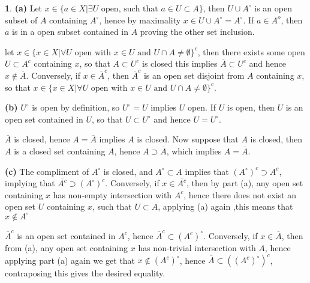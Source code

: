 \documentclass[10.5pt]{article}
\theoremstyle{definition}
\newtheorem{pb}{}
\newcommand{\set}[1]{\{#1\}}
\newcommand{\tand}[1]{\text{ and }}
\begin{document}
    \begin{pb}
        \textbf{(a)} Let \(x \in \set{a\in X \vert \exists U \text{ open, such that } a \in U \subset A}\), then \(U \cup A^\circ\) is an open subset of \(A\) containing \(A^\circ\),
        hence by maximality \(x \in U \cup A^\circ = A^\circ\). If \(a \in A^o\), then \(a\) is in a open subset contained in \(A\) proving the other set inclusion.

        let \(x \in \set{x \in X \vert \forall U \text{ open with } x \in U \tand UU \cap A \neq \emptyset}^c\), then there exists some open \(U \subset A^c\) containing \(x\),
        so that \(A \subset U^c\) is closed this implies \(\overline{A} \subset U^c\) and hence \(x \not \in \overline{A}\). Conversely, if \(x \in \overline{A}^c\), then
        \(\overline{A}^c\) is an open set disjoint from \(A\) containing \(x\), so that \(x \in \set{x \in X \vert \forall U \text{ open with } x \in U \tand UU \cap A \neq \emptyset}^c\).

        \textbf{(b)} \(U^\circ\) is open by definition, so \(U^\circ = U\) implies \(U\) open. If \(U\) is open, then \(U\) is an open set contained in \(U\), so that \(U \subset U^\circ\) 
        and hence \(U = U^\circ\).

        \(\overline{A}\) is closed, hence \(A = \overline{A}\) implies \(A\) is closed. Now suppose that \(A\) is closed, then \(A\) is a closed set containing \(A\), hence
        \(A \supset \overline{A}\), which implies \(A = \overline{A}\).

        \textbf{(c)} The compliment of \(A^\circ\) is closed, and \(A^\circ \subset A\) implies that \(\left(A^\circ\right)^c \supset A^c\), implying that
        \(\overline{A^c} \supset \left(A^\circ\right)^c\). Conversely, if \(x \in \overline{A^c}\), then by part (a), any open set containing \(x\) has non-empty
        intersection with \(A^c\), hence there does not exist an open set \(U\) containing \(x\), such that \(U \subset A\), applying (a) again ,this means that
        \(x \not \in A^\circ\)

        \(\overline{A}^c\) is an open set contained in \(A^c\), hence \(\overline{A}^c \subset (A^c)^\circ\). Conversely, if \(x \in \overline{A}\), then from (a), any open set containing
        \(x\) has non-trivial intersection with \(A\), hence applying part (a) again we get that \(x \not \in (A^c)^\circ\), hence \(\overline{A} \subset \left((A^c)^\circ\right)^c\),
        contraposing this gives the desired equality.
    \end{pb}
\end{document}

